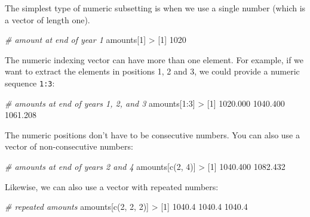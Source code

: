\documentclass[
]{book}
\newenvironment{Shaded}{\begin{snugshade}}{\end{snugshade}}
\newcommand{\CommentTok}[1]{\textcolor[rgb]{0.56,0.35,0.01}{\textit{#1}}}
\newcommand{\DecValTok}[1]{\textcolor[rgb]{0.00,0.00,0.81}{#1}}
\newcommand{\FloatTok}[1]{\textcolor[rgb]{0.00,0.00,0.81}{#1}}
\newcommand{\FunctionTok}[1]{\textcolor[rgb]{0.00,0.00,0.00}{#1}}
\newcommand{\NormalTok}[1]{#1}
\newcommand{\SpecialCharTok}[1]{\textcolor[rgb]{0.00,0.00,0.00}{#1}}
\begin{document}
The simplest type of numeric subsetting is when we use a single number (which
is a vector of length one).

\begin{Shaded}
\begin{Highlighting}[]
\CommentTok{\# amount at end of year 1}
\NormalTok{amounts[}\DecValTok{1}\NormalTok{]}
\SpecialCharTok{\textgreater{}}\NormalTok{ [}\DecValTok{1}\NormalTok{] }\DecValTok{1020}
\end{Highlighting}
\end{Shaded}

The numeric indexing vector can have more than one element. For example, if
we want to extract the elements in positions 1, 2 and 3, we could provide a
numeric sequence \texttt{1:3}:

\begin{Shaded}
\begin{Highlighting}[]
\CommentTok{\# amounts at end of years 1, 2, and 3}
\NormalTok{amounts[}\DecValTok{1}\SpecialCharTok{:}\DecValTok{3}\NormalTok{]}
\SpecialCharTok{\textgreater{}}\NormalTok{ [}\DecValTok{1}\NormalTok{] }\FloatTok{1020.000} \FloatTok{1040.400} \FloatTok{1061.208}
\end{Highlighting}
\end{Shaded}

The numeric positions don't have to be consecutive numbers. You can also use
a vector of non-consecutive numbers:

\begin{Shaded}
\begin{Highlighting}[]
\CommentTok{\# amounts at end of years 2 and 4}
\NormalTok{amounts[}\FunctionTok{c}\NormalTok{(}\DecValTok{2}\NormalTok{, }\DecValTok{4}\NormalTok{)]}
\SpecialCharTok{\textgreater{}}\NormalTok{ [}\DecValTok{1}\NormalTok{] }\FloatTok{1040.400} \FloatTok{1082.432}
\end{Highlighting}
\end{Shaded}

Likewise, we can also use a vector with repeated numbers:

\begin{Shaded}
\begin{Highlighting}[]
\CommentTok{\# repeated amounts}
\NormalTok{amounts[}\FunctionTok{c}\NormalTok{(}\DecValTok{2}\NormalTok{, }\DecValTok{2}\NormalTok{, }\DecValTok{2}\NormalTok{)]}
\SpecialCharTok{\textgreater{}}\NormalTok{ [}\DecValTok{1}\NormalTok{] }\FloatTok{1040.4} \FloatTok{1040.4} \FloatTok{1040.4}
\end{Highlighting}
\end{Shaded}
\end{document}
